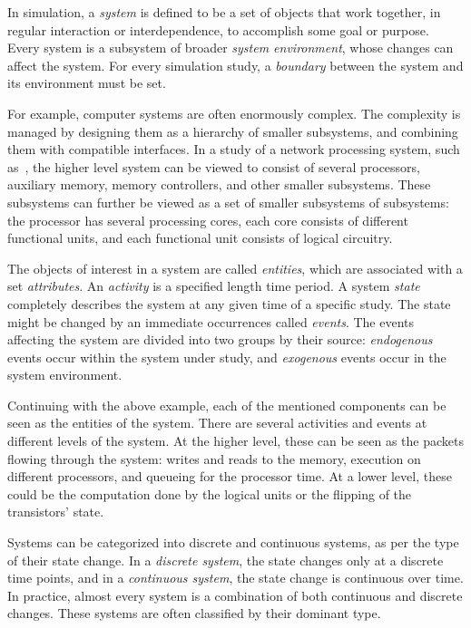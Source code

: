 In simulation, a \emph{system} is defined to be a set of objects that work together, in regular interaction or interdependence, to accomplish some goal or purpose. Every system is a subsystem of broader \emph{system environment}, whose changes can affect the system. For every simulation study, a \emph{boundary} between the system and its environment must be set.~\cite{Banks:2010:DES}

For example, computer systems are often enormously complex. The complexity is managed by designing them as a hierarchy of smaller subsystems, and combining them with compatible interfaces. In a study of a network processing system, such as~\cite{cavium OCTEON}, the higher level system can be viewed to consist of several processors, auxiliary memory, memory controllers, and other smaller subsystems. These subsystems can further be viewed as a set of smaller subsystems of subsystems: the processor has several processing cores, each core consists of different functional units, and each functional unit consists of logical circuitry.~\cite{Banks:2010:DES}

The objects of interest in a system are called \emph{entities}, which are associated with a set \emph{attributes}. An \emph{activity} is a specified length time period. A system \emph{state} completely describes the system at any given time of a specific study. The state might be changed by an immediate occurrences called \emph{events}. The events affecting the system are divided into two groups by their source: \emph{endogenous} events occur within the system under study, and \emph{exogenous} events occur in the system environment.~\cite{Banks:2010:DES}

Continuing with the above example, each of the mentioned components can be seen as the entities of the system. There are several activities and events at different levels of the system. At the higher level, these can be seen as the packets flowing through the system: writes and reads to the memory, execution on different processors, and queueing for the processor time. At a lower level, these could be the computation done by the logical units or the flipping of the transistors' state.

Systems can be categorized into discrete and continuous systems, as per the type of their state change. In a \emph{discrete system}, the state changes only at a discrete time points, and in a \emph{continuous system}, the state change is continuous over time. In practice, almost every system is a combination of both continuous and discrete changes. These systems are often classified by their dominant type.~\cite{Banks:2010:DES}

